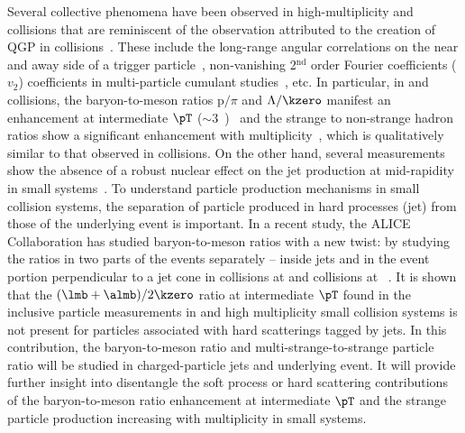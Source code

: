 \documentclass[ALICE,manyauthors]{cernphprep}
\begin{document}
Several collective phenomena have been observed in high-multiplicity \pp and \pPb collisions that are reminiscent of the observation attributed to the creation of QGP in \PbPb collisions~\cite{Aad:2015gqa, Abelev:2012ola, ABELEV:2013wsa, Khachatryan:2015waa, Acharya:2019vdf, Abelev:2014uua, Adam:2015vsf}.
These include the long-range angular correlations on the near and away side of a trigger particle~\cite{Aad:2015gqa, Abelev:2012ola, ABELEV:2013wsa}, non-vanishing 2$^\mathrm{nd}$ order Fourier coefficients ($v_{2}$) coefficients in multi-particle cumulant studies~\cite{Acharya:2019vdf, Khachatryan:2015waa}, etc.
In particular, in \pp and \pPb collisions, the baryon-to-meson ratios p$/\pi$ and $\Lambda/\kzero$ manifest an enhancement at intermediate $\pT$ ($\sim 3$~\GeVc)~\cite{Acharya:2018orn, Khachatryan:2016yru, Abelev:2013xaa, ALICE:2017jyt} and the strange to non-strange hadron ratios show a significant enhancement with multiplicity~\cite{Abelev:2013haa, ALICE:2017jyt, Khachatryan:2016yru}, which is qualitatively similar to that observed in \PbPb collisions.
On the other hand, several measurements show the absence of a robust nuclear effect on the jet production at mid-rapidity in small systems~\cite{ALICE:2017svf, Acharya:2019jyg, Acharya:2019tku, ALICE:2014dla, Abelev:2013fn, Acharya:2018eat, Acharya:2017okq, Adam:2015xea, Adam:2016jfp}.
To understand particle production mechanisms in small collision systems, the separation of particle produced in hard processes (jet) from those of the underlying event is important.
In a recent study, the ALICE Collaboration has studied baryon-to-meson ratios with a new twist: by studying the ratios in two parts of the events separately -- inside jets and in the event portion perpendicular to a jet cone in \pp collisions at \seven and \pPb collisions at \fivenn~\cite{Acharya:2021oaa}. 
It is shown that the $(\lmb + \almb)/2\kzero$ ratio at intermediate $\pT$ found in the inclusive particle measurements in \PbPb and high multiplicity small collision systems is not present for particles associated with hard scatterings tagged by jets.
In this contribution, the baryon-to-meson ratio and multi-strange-to-strange particle ratio will be studied in charged-particle jets and underlying event.
It will provide further insight into disentangle the soft process or hard scattering contributions of the baryon-to-meson ratio enhancement at intermediate $\pT$ and the strange particle production increasing with multiplicity in small systems.
\end{document}
